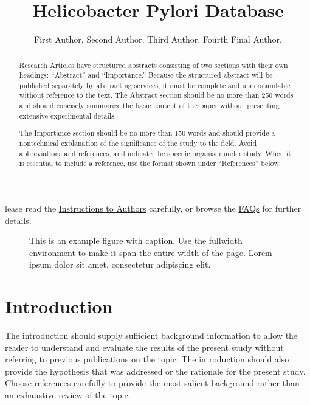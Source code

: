 \documentclass[lineno]{asm-article}
\title{Helicobacter Pylori Database}
\author{%
  First Author,\afn{a}
  Second Author,\afn{a,\authfn{2}}
  Third Author,\afn{b}
  Fourth Final Author,\afn{a,b,\authfn{1}}
}
\affil{%
  University Name, Faculty Group, Department, City, Country\afn{a};
  Company Name, City, Country\afn{b}
}
\begin{document}
\maketitle


\begin{abstract}
Research Articles have structured abstracts consisting of two sections with their own headings: ``Abstract'' and ``Importance.'' Because the structured abstract will be published separately by abstracting services, it must be complete and understandable without reference to the text. The Abstract section should be no more than 250 words and should  concisely  summarize  the  basic  content  of  the  paper without presenting extensive experimental details.

\begin{importance}
The Importance section should be no more than 150 words and should provide a nontechnical explanation of the significance of the study to the field. Avoid abbreviations and references, and indicate the specific organism under study. When it is essential to include a reference, use the format shown under ``References'' below.
\end{importance}

\end{abstract}


lease read the \href{http://journalitas.asm.org/t/175157-msystems-ita}{Instructions to Authors} carefully, or browse the \href{http://msystems.asm.org/content/faq}{FAQs} for further details.

\begin{figure}[bp!]
\begin{fullwidth}
\caption{This is an example figure with caption. Use the fullwidth environment to make it span the entire width of the page. Lorem ipsum dolor sit amet, consectetur adipiscing elit.}
\end{fullwidth}
\end{figure}


\section{Introduction}

The introduction should supply sufficient background information to allow the reader to understand and evaluate the results of the present study without referring to previous publications on the topic. The introduction should also provide the hypothesis that was addressed or the rationale for the present study. Choose references carefully to provide the most salient background rather than an exhaustive review of the topic.
\end{document}
